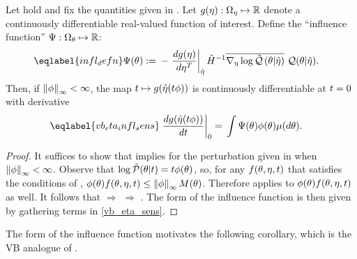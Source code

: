 \begin{cor}
%
Let  hold and fix the quantities given in
. Let $g(\eta): \Omega_{\eta} \mapsto \mathbb{R}$ denote a
continuously differentiable real-valued function of interest.  Define the
``influence function'' $\Psi: \Omega_{\theta} \mapsto \mathbb{R}$:
%
\begin{align}\eqlabel{infl_defn}
%
\infl(\theta) :={}&
    - \fracat{d g(\eta)}{ d \eta^T}{\etaopt} \hessopt^{-1}
        \lqgradbar{\theta \vert \etaopt}
        \q(\theta \vert \etaopt).
%
\end{align}
%
Then, if $\left\Vert\phi\right\Vert_{\infty} < \infty$, the map $t \mapsto g(\hat\eta(t \phi))$ is
continuously differentiable at $t=0$ with derivative
%
\begin{align}\eqlabel{vb_eta_infl_sens}
%
\fracat{d g(\etaopt(\t \phi))}{d \t}{0} ={}&
    \int \infl(\theta) \phi(\theta) \mu(d\theta).
%
\end{align}
%
\begin{proof}
%
It suffices to show that  implies
 for the perturbation given in 
when $\left\Vert\phi\right\Vert_{\infty} < \infty$.  Observe that $\log \tilde{\mathcal{P}}(\theta \vert t) = t
\phi(\theta)$, so, for any $f(\theta, \eta, t)$ that satisfies the conditions
of ,
%
%
$\phi(\theta) f(\theta, \eta, t) \le \left\Vert\phi\right\Vert_{\infty} M(\theta)$.
%
%
Therefore  applies to $\phi(\theta) f(\theta, \eta, t)$
as well.  It follows that  $\Rightarrow$
 $\Rightarrow$ .
%
The form of the influence function is then given by gathering terms in
\eqref{vb_eta_sens}.
%
\end{proof}
%
\end{cor}


The form of the influence function motivates the following corollary,
which is the VB analogue of \citet[Result 11]{gustafson:1996:local}.


